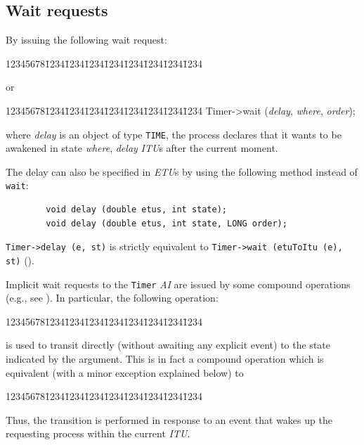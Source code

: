 \subsection{Wait requests}
\label{rm_ti_wa}

By issuing the following wait request:
{\tt\begin{tabbing}
12345678\=1234\=1234\=1234\=1234\=1234\=1234\=1234\=1234\kill
{}
\end{tabbing}}
\noindent
or
{\tt\begin{tabbing}
12345678\=1234\=1234\=1234\=1234\=1234\=1234\=1234\=1234\kill
\>Timer->wait ({\em delay}, {\em where}, {\em order});
\end{tabbing}}
\noindent
where {\em delay\/} is an object of type {\tt TIME},
the process declares that it wants to be awakened in state {\em where},
{\em delay\/} {\em ITU\/}s after the current moment.

The delay can also be specified in {\em ETU\/}s by using the following method
instead of {\tt wait}:
\begin{verbatim}
        void delay (double etus, int state);
        void delay (double etus, int state, LONG order);
\end{verbatim}
{\tt Timer->delay (e, st)} is strictly equivalent to {\tt Timer->wait (etuToItu (e), st)} ().

Implicit wait requests to the {\tt Timer} {\em AI} are issued by some
compound operations (e.g., see ).
In particular, the following operation:
{\tt\begin{tabbing}
12345678\=1234\=1234\=1234\=1234\=1234\=1234\=1234\=1234\kill
{}
\end{tabbing}}
\noindent
is used to transit directly (without awaiting any explicit event) to the
state indicated by the argument.
This is in fact a compound operation which is equivalent (with a minor exception
explained below) to
{\tt\begin{tabbing}
12345678\=1234\=1234\=1234\=1234\=1234\=1234\=1234\=1234\kill
{} \\
\end{tabbing}}
\noindent
Thus, the transition is performed in response to an event that
wakes up the requesting process within the current {\em ITU}.

